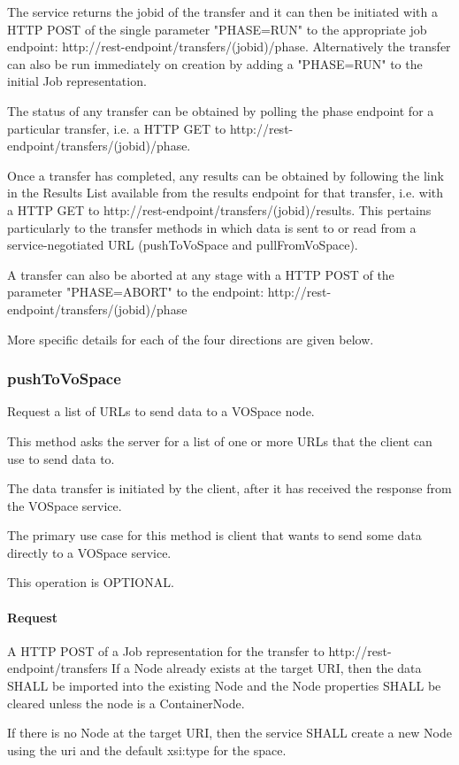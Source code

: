 \documentclass[11pt,a4paper]{ivoa}
\begin{document}
The service returns the jobid of the transfer and it can then be initiated with a HTTP POST of the single parameter "PHASE=RUN" to the appropriate job endpoint: http://rest-endpoint/transfers/(jobid)/phase. Alternatively the transfer can also be run immediately on creation by adding a "PHASE=RUN" to the initial Job representation.

The status of any transfer can be obtained by polling the phase endpoint for a particular transfer, i.e. a HTTP GET to http://rest-endpoint/transfers/(jobid)/phase.

Once a transfer has completed, any results can be obtained by following the link in the Results List available from the results endpoint for that transfer, i.e. with a HTTP GET to http://rest-endpoint/transfers/(jobid)/results. This pertains particularly to the transfer methods in which data is sent to or read from a service-negotiated URL (pushToVoSpace and pullFromVoSpace).

A transfer can also be aborted at any stage with a HTTP POST of the parameter "PHASE=ABORT" to the endpoint: http://rest-endpoint/transfers/(jobid)/phase

More specific details for each of the four directions are given below.

\subsubsection{pushToVoSpace}
Request a list of URLs to send data to a VOSpace node.

This method asks the server for a list of one or more URLs that the client can use to send data to.

The data transfer is initiated by the client, after it has received the response from the VOSpace service.

The primary use case for this method is client that wants to send some data directly to a VOSpace service.

This operation is OPTIONAL.

\paragraph{Request}
A HTTP POST of a Job representation for the transfer to http://rest-endpoint/transfers
If a Node already exists at the target URI, then the data SHALL be imported into the existing Node and the Node properties SHALL be cleared unless the node is a ContainerNode.

If there is no Node at the target URI, then the service SHALL create a new Node using the uri and the default xsi:type for the space.
\end{document}
